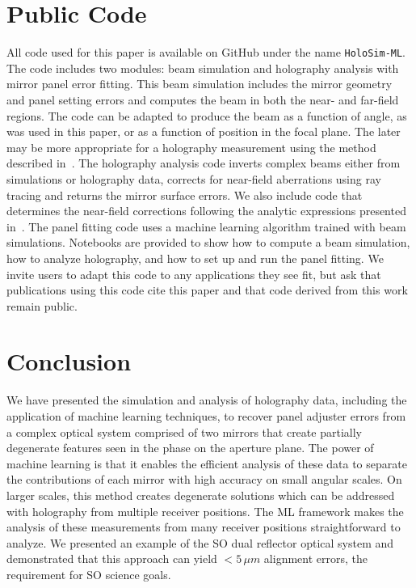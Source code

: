 \section{Public Code}
\label{sec:code}
All code used for this paper is available on GitHub under the name \verb|HoloSim-ML|. The code includes two modules: beam simulation and holography analysis with mirror panel error fitting.  This beam simulation includes the mirror geometry and panel setting errors and computes the beam in both the near- and far-field regions.  The code can be adapted to produce the beam as a function of angle, as was used in this paper, or as a function of position in the focal plane.  The later may be more appropriate for a holography measurement using the method described in~\cite{fyst_holog}. The holography analysis code inverts complex beams either from simulations or holography data, corrects for near-field aberrations using ray tracing and returns the mirror surface errors.  We also include code that determines the near-field corrections following the analytic expressions presented in~\cite{alma_holog}.  The panel fitting code uses a machine learning algorithm  trained with beam simulations.  Notebooks are provided to show how to compute a beam simulation, how to analyze holography, and how to set up and run the panel fitting.  We invite users to adapt this code to any applications they see fit, but ask that publications using this code cite this paper and that code derived from this work remain public.

\section{Conclusion}
\label{sec:holosim_conclusion}
We have presented the simulation and analysis of holography data, including the application of machine learning techniques, to recover panel adjuster errors from a complex optical system comprised of two mirrors that create partially degenerate features seen in the phase on the aperture plane.  The power of machine learning is that it enables the efficient analysis of these data to separate the contributions of each mirror with high accuracy on small angular scales.  On larger scales, this method creates degenerate solutions which can be addressed with holography from multiple receiver positions.  The ML framework makes the analysis of these measurements from many receiver positions straightforward to analyze.  We presented an example of the SO dual reflector optical system and demonstrated that this approach can yield $<5\,\mu m$ alignment errors, the requirement for SO science goals.

